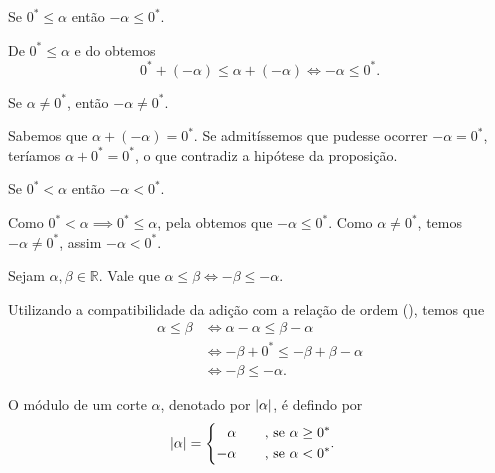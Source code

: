 \documentclass[../main.tex]{subfiles}
\begin{document}
\begin{prop}\label{reais-prop-xPositivoMenosxNegativo1}
    Se $0^* \leq \alpha$ então $-\alpha \leq 0^*$.
\end{prop}
\begin{dem}
    De $0^* \leq \alpha$ e do  obtemos  \\ 
    \[ 0^* + (-\alpha) \leq \alpha + (-\alpha) \iff -\alpha \leq 0^*. \]
\end{dem}
\begin{prop}
    Se $\alpha \neq 0^*$, então $-\alpha \neq 0^*$.
\end{prop}
\begin{dem}
    Sabemos que $\alpha + (-\alpha) = 0^*$. Se admitíssemos que pudesse ocorrer $-\alpha = 0^*$, teríamos $\alpha + 0^* = 0^*$, o que contradiz a hipótese da proposição. 
\end{dem}
\begin{corol}\label{reais-corol-xPositivoMenosxNegativo1}
    Se $0^* < \alpha$ então $-\alpha < 0^*$.
\end{corol}
\begin{dem}
    Como $0^* < \alpha \implies 0^* \leq \alpha$, pela  obtemos que $-\alpha \leq 0^*$. Como $\alpha \neq 0^*$, temos $-\alpha \neq 0^*$, assim $-\alpha < 0^*$.
\end{dem}

\begin{teo}\label{reais-teo-desigualdadeSimetrico}
    Sejam $\alpha, \beta \in \mathbb{R}$. Vale que $\alpha \leq \beta \iff -\beta \leq -\alpha$.
\end{teo}
\begin{dem}
    Utilizando a compatibilidade da adição com a relação de ordem (), temos que 
    \begin{align*}
        \alpha \leq \beta
        &\iff \alpha - \alpha \leq \beta - \alpha \\
        &\iff -\beta + 0^* \leq - \beta + \beta - \alpha \\
        &\iff -\beta \leq -\alpha.
    \end{align*}
\end{dem}

\begin{defi}\label{reais-def-modulo1}
    O módulo de um corte $\alpha$, denotado por $\abs{\alpha}$, é defindo por
    \begin{equation*}
        \abs{\alpha} = 
        \begin{cases}
        \begin{aligned}
             &\alpha \hspace{0.6cm} \text{ , se } \alpha \geq 0^* \\
            -&\alpha \hspace{0.6cm} \text{ , se } \alpha < 0^*
        \end{aligned}.
        \end{cases}            
    \end{equation*}
\end{defi}
\end{document}
